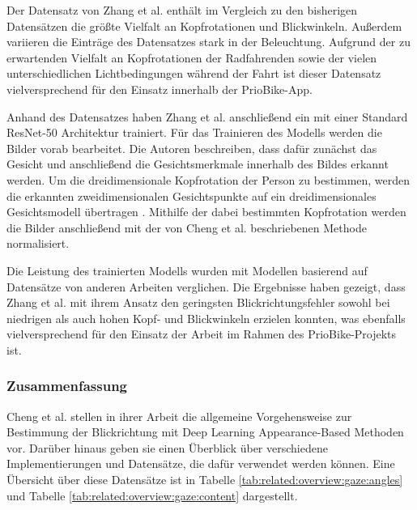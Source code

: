 Der Datensatz von Zhang et al. enthält im Vergleich zu den bisherigen Datensätzen die größte Vielfalt an Kopfrotationen und Blickwinkeln. Außerdem variieren die Einträge des Datensatzes stark in der Beleuchtung. Aufgrund der zu erwartenden Vielfalt an Kopfrotationen der Radfahrenden sowie der vielen unterschiedlichen Lichtbedingungen während der Fahrt ist dieser Datensatz vielversprechend für den Einsatz innerhalb der PrioBike-App.

Anhand des Datensatzes haben Zhang et al. anschließend ein \cnn mit einer Standard ResNet-50 Architektur trainiert. Für das Trainieren des Modells werden die Bilder vorab bearbeitet. Die Autoren beschreiben, dass dafür zunächst das Gesicht und anschließend die Gesichtsmerkmale innerhalb des Bildes erkannt werden. Um die dreidimensionale Kopfrotation der Person zu bestimmen, werden die erkannten zweidimensionalen Gesichtspunkte auf ein dreidimensionales Gesichtsmodell übertragen \cite{paper:eth-xgaze-3d-pose}. Mithilfe der dabei bestimmten Kopfrotation werden die Bilder anschließend mit der von Cheng et al. beschriebenen Methode \cite{paper:basics:survey} normalisiert.

Die Leistung des trainierten Modells wurden mit Modellen basierend auf Datensätze von anderen Arbeiten verglichen. Die Ergebnisse haben gezeigt, dass Zhang et al. mit ihrem Ansatz den geringsten Blickrichtungsfehler sowohl bei niedrigen als auch hohen Kopf- und Blickwinkeln erzielen konnten, was ebenfalls vielversprechend für den Einsatz der Arbeit im Rahmen des PrioBike-Projekts ist. 

\subsubsection{Zusammenfassung}


Cheng et al. stellen in ihrer Arbeit die allgemeine Vorgehensweise zur Bestimmung der Blickrichtung mit Deep Learning Appearance-Based Methoden vor. Darüber hinaus geben sie einen Überblick über verschiedene Implementierungen und Datensätze, die dafür verwendet werden können. Eine Übersicht über diese Datensätze ist in Tabelle \ref{tab:related:overview:gaze:angles} und Tabelle \ref{tab:related:overview:gaze:content} \cite{paper:eth-xgaze, paper:gaze360} dargestellt.

